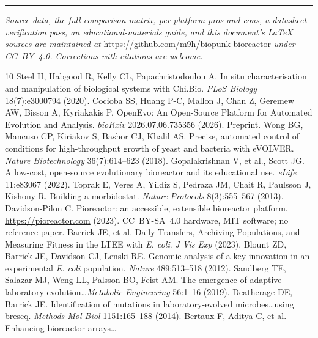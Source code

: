 \documentclass[11pt,a4paper]{article}
\begin{document}
\vspace{1em}
\hrule
\vspace{0.5em}
{\small\textit{Source data, the full comparison matrix, per-platform pros and cons, a
datasheet-verification pass, an educational-materials guide, and this document's \LaTeX{}
sources are maintained at} \url{https://github.com/m9h/biopunk-bioreactor} \textit{under
CC~BY~4.0. Corrections with citations are welcome.}}

\begin{thebibliography}{10}\small
{} Steel H, Habgood R, Kelly CL, Papachristodoulou A.
  In situ characterisation and manipulation of biological systems with Chi.Bio.
  \textit{PLoS Biology} 18(7):e3000794 (2020).
 Cocioba SS, Huang P-C, Mallon J, Chan Z, Geremew AW, Bisson A,
  Kyriakakis P. OpenEvo: An Open-Source Platform for Automated Evolution and Analysis.
  \textit{bioRxiv} 2026.07.06.735356 (2026). Preprint.
 Wong BG, Mancuso CP, Kiriakov S, Bashor CJ, Khalil AS.
  Precise, automated control of conditions for high-throughput growth of yeast and bacteria
  with eVOLVER. \textit{Nature Biotechnology} 36(7):614--623 (2018).
 Gopalakrishnan V, et al., Scott JG.
  A low-cost, open-source evolutionary bioreactor and its educational use.
  \textit{eLife} 11:e83067 (2022).
 Toprak E, Veres A, Yildiz S, Pedraza JM, Chait R, Paulsson J,
  Kishony R. Building a morbidostat. \textit{Nature Protocols} 8(3):555--567 (2013).
 Davidson-Pilon C. Pioreactor: an accessible, extensible bioreactor
  platform. \url{https://pioreactor.com} (2023). CC~BY-SA~4.0 hardware, MIT software; no
  reference paper.
 Barrick JE, et al. Daily Transfers, Archiving Populations, and
  Measuring Fitness in the LTEE with \textit{E. coli}. \textit{J Vis Exp} (2023).
 Blount ZD, Barrick JE, Davidson CJ, Lenski RE. Genomic analysis of a
  key innovation in an experimental \textit{E. coli} population. \textit{Nature} 489:513--518 (2012).
 Sandberg TE, Salazar MJ, Weng LL, Palsson BO, Feist AM. The emergence
  of adaptive laboratory evolution\dots \textit{Metabolic Engineering} 56:1--16 (2019).
 Deatherage DE, Barrick JE. Identification of mutations in
  laboratory-evolved microbes\dots using breseq. \textit{Methods Mol Biol} 1151:165--188 (2014).
 Bertaux F, Aditya C, et al. Enhancing bioreactor arrays\dots

\end{thebibliography}
\end{document}
